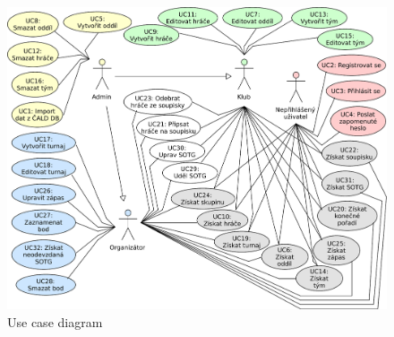\begin{figure}[ht!]
\centering
\includegraphics[width=130mm]{./images/use-case.pdf}
\caption{Use case diagram\label{overflow}}
\end{figure}
